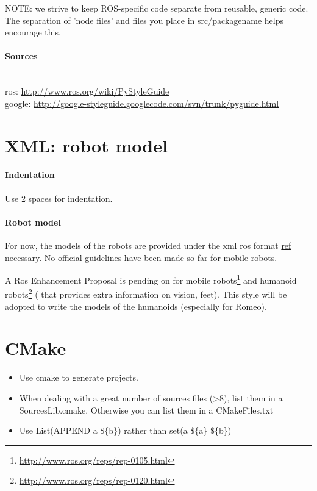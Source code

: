 NOTE: we strive to keep ROS-specific code separate from reusable, generic code. The separation of 'node files' and files you place in src/packagename helps encourage this. 


\paragraph{Sources}~\\
ros: \url{http://www.ros.org/wiki/PyStyleGuide}\\
google: \url{http://google-styleguide.googlecode.com/svn/trunk/pyguide.html}

\section{XML: robot model}
\paragraph{Indentation} Use 2 spaces for indentation.

\paragraph{Robot model}
For now, the models of the robots are provided under the xml ros format \url{ref necessary}.
No official guidelines have been made so far for mobile robots.

A Ros Enhancement Proposal is pending on for mobile robots\footnote{\url{http://www.ros.org/reps/rep-0105.html}} 
and humanoid robots\footnote{\url{http://www.ros.org/reps/rep-0120.html}}
( that provides extra information on vision, feet).
This style will be adopted to write the models of the humanoids (especially for Romeo).


\section{CMake}
\begin{itemize}
\item Use cmake to generate projects.

\item When dealing with a great number of sources files (>8), list them in a SourcesLib.cmake.
Otherwise you can list them in a CMakeFiles.txt

\item Use List(APPEND a \$\{b\}) rather than set(a \$\{a\} \$\{b\})
\end{itemize}


